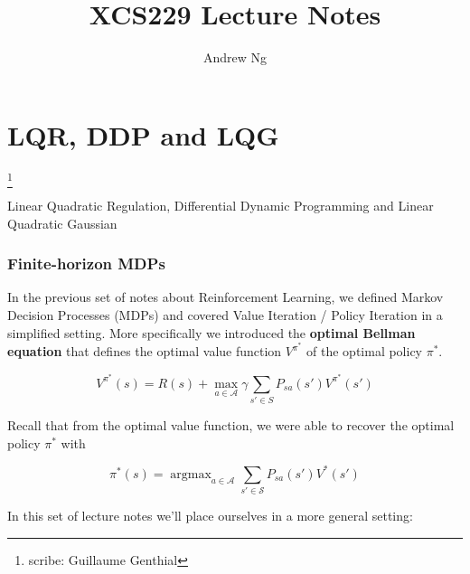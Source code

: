 \documentclass{article}
\newcommand\blfootnote[1]{%
	\begingroup
	\renewcommand\thefootnote{}\footnote{#1}%
	\addtocounter{footnote}{-1}%
	\endgroup
}
\begin{document}
\title{XCS229 Lecture Notes}
\author{Andrew Ng}
\date{}
\maketitle




\setcounter{part}{13}
\part{LQR, DDP and LQG}\blfootnote{scribe: Guillaume Genthial}
Linear Quadratic Regulation, Differential Dynamic Programming and Linear Quadratic Gaussian 

\section{Finite-horizon MDPs}
\label{sec:1}
In the previous set of notes about Reinforcement Learning, we defined Markov Decision Processes (MDPs) and covered Value Iteration / Policy Iteration in a simplified setting. More specifically we introduced the \textbf{optimal Bellman equation} that defines the optimal value function $ V^{\pi^*} $ of the optimal policy $ \pi^* $.

\[ V^{\pi^*} (s) = R(s) + \max_{a \in \mathcal{A}} \gamma \sum_{s' \in S} P_{s a} (s') V^{\pi^*} (s') \]

Recall that from the optimal value function, we were able to recover the optimal policy $ \pi^* $ with

\[ \pi^* (s) = \operatorname{argmax}_{a \in \mathcal{A}} \sum_{s' \in \mathcal{S}} P_{sa}(s') V^{*} (s') \]

In this set of lecture notes we'll place ourselves in a more general setting:
\end{document}
